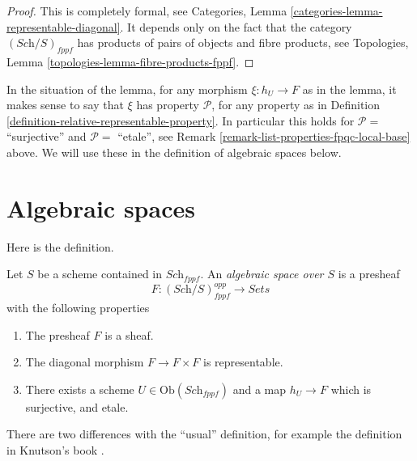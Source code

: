 \begin{proof}
This is completely formal, see
Categories, Lemma \ref{categories-lemma-representable-diagonal}.
It depends only on the fact that the category $(\textit{Sch}/S)_{fppf}$
has products of pairs of objects and fibre products, see
Topologies, Lemma \ref{topologies-lemma-fibre-products-fppf}.
\end{proof}

\noindent
In the situation of the lemma, for any morphism
$\xi : h_U \to F$ as in the lemma, it makes sense
to say that $\xi$ has property $\mathcal{P}$, for any property
as in Definition \ref{definition-relative-representable-property}.
In particular this holds for $\mathcal{P} = $ ``surjective''
and $\mathcal{P} = $ ``etale'', see
Remark \ref{remark-list-properties-fpqc-local-base}
above. We will use these in the definition
of algebraic spaces below. 


















\section{Algebraic spaces}
\label{section-algebraic-spaces}

\noindent
Here is the definition.

\begin{definition}
\label{definition-algebraic-space}
Let $S$ be a scheme contained in $\textit{Sch}_{fppf}$.
An {\it algebraic space over $S$} is a presheaf
$$
F : (\textit{Sch}/S)^{opp}_{fppf} \longrightarrow \textit{Sets}
$$
with the following properties
\begin{enumerate}
\item The presheaf $F$ is a sheaf.
\item The diagonal morphism $F  \to F \times F$ is representable.
\item There exists a scheme $U \in \text{Ob}(\textit{Sch}_{fppf})$
and a map $h_U \to F$ which is surjective, and etale.
\end{enumerate}
\end{definition}

\noindent
There are two differences with the ``usual'' definition, for example the
definition in Knutson's book \cite{Kn}.

